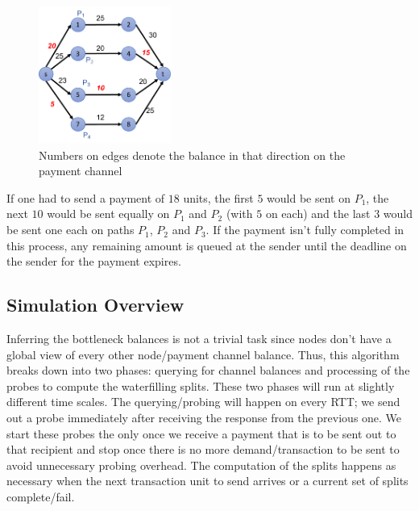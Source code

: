 \documentclass[a4paper]{article}
\newcommand{\TU}{transaction unit\xspace}
\begin{document}
\begin{figure}
\includegraphics[height=4.5cm]{sample_graph.pdf}
\caption{Numbers on edges denote the balance in that direction on the payment channel}
\label{fig:sample_graph}
\end{figure}

If one had to send a payment of $18$ units, the first $5$ would be sent on $P_1$, the next $10$ would be sent equally on $P_1$ and $P_2$ (with $5$ on each) and the
last $3$ would be sent one each on paths $P_1$, $P_2$ and $P_3$. If the payment isn't fully completed in this process, any remaining amount is queued at the sender
until the deadline on the sender for the payment expires.

\subsection{Simulation Overview}
Inferring the bottleneck balances is not a trivial task since nodes don't have a global view of every other node/payment channel balance. Thus, this algorithm
breaks down into two phases: querying for channel balances and processing of the probes to compute the waterfilling splits. These two phases will run at slightly different time scales. The querying/probing will happen on every RTT; we send out a probe immediately after receiving the response from the previous one. 
We start these probes the only once we receive a payment that is to be sent out to that recipient and stop once there is no more demand/transaction to be sent
to avoid unnecessary probing overhead. The computation of the splits happens as necessary when the next \TU to send arrives or a current set of splits complete/fail.
\end{document}
